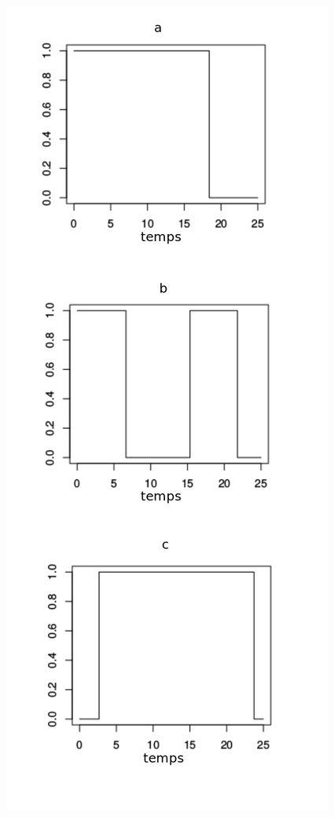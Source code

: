 \begin{frame}
\begin{figure}[!h]
\begin{minipage}[c]{.46\linewidth}
   \end{minipage} \hfill
   \begin{minipage}[c]{.46\linewidth}
   \centering
      \includegraphics[scale=0.2]{figs/synchronisation.png}
   \end{minipage}
\end{figure}

\end{frame}

